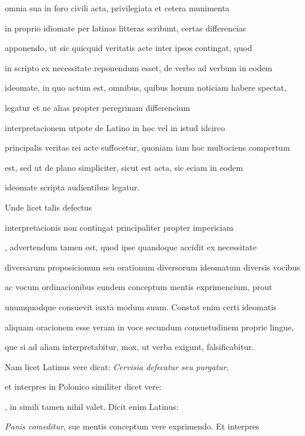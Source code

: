 omnia sua in foro civili acta, privilegiata et cetera munimenta

in proprio idiomate per latinas litteras scribunt, certas differencias

apponendo, ut sic quicquid veritatis acte inter ipsos contingat, quod

in scripto ex necessitate reponendum esset, de verbo ad verbum in eodem

ideomate, in quo actum est, omnibus, quibus horum noticiam habere spectat,

 legatur et ne alias propter peregrinam differencium 

 interpretacionem utpote de Latino in hoc vel in istud idcirco

principalis veritas rei acte suffocetur, quoniam iam hoc multociens compertum

est, sed ut de plano simpliciter, sicut est acta, sic eciam in eodem

\splitlines{}

ideomate scripta audientibus legatur.

\indentK Unde licet talis defectus

\fulllines{}

interpretacionis non contingat principaliter propter impericiam 

, advertendum tamen est, quod ipse quandoque accidit ex necessitate

diversarum proposicionum seu orationum diversorum ideomatum diversis vocibus

ac vocum ordinacionibus eundem conceptum mentis exprimencium, prout

unumquodque consuevit iuxta modum suum. Constat enim certi ideomatis

aliquam oracionem esse veram in voce secundum consuetudinem proprie lingue,

que si ad aliam interpretabitur, mox, ut verba exigunt, falsificabitur.

\indentK Nam licet Latinus vere dicat: \textit{Cervisia defecatur seu purgatur},

et interpres in Polonico similiter dicet vere:   

   , in simili tamen nihil valet. Dicit enim Latinus:

\textit{Panis comeditur}, sue mentis conceptum vere exprimendo. Et interpres

